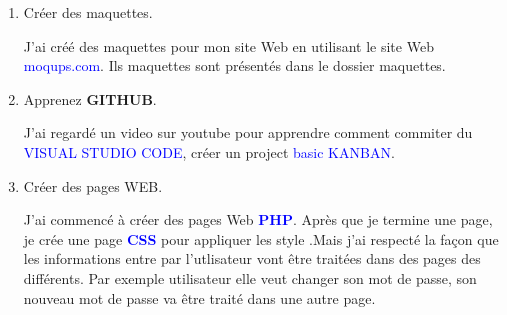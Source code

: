 \documentclass{article}
\begin{document}
\begin{enumerate}
\begin{enumerate}
        
        
        
        
         \item \textcolor{amethyst}{Créer des maquettes}.
         
         \vspace{0.4cm}
                \setlength{\parindent}{1cm} J'ai créé des maquettes pour mon site Web en utilisant le site Web \textcolor{blue}{moqups.com}. Ils maquettes sont présentés dans le dossier maquettes.
         
\hspace*{-1.05in}
               \noindent{}         
         \vspace{1cm}
         \item \textcolor{amethyst}{Apprenez \textbf{GITHUB}}.
         
         \vspace{0.4cm}
                \setlength{\parindent}{1cm} J'ai regardé un video sur youtube pour apprendre comment commiter du \textcolor{blue}{VISUAL STUDIO CODE}, créer un project \textcolor{blue}{basic KANBAN}.
         
         \item \textcolor{amethyst}{Créer des pages WEB}.
         
         \vspace{0.4cm}
                \setlength{\parindent}{1cm} J'ai commencé à créer des pages Web \textcolor{blue}{\textbf{PHP}}. Après que je termine une page, je crée une page \textcolor{blue}{\textbf{CSS}} pour appliquer les style .Mais j'ai respecté la façon que les informations entre par l'utlisateur vont  être traitées dans des pages des différents. Par exemple utilisateur elle veut changer son mot de passe, son nouveau mot de passe va être traité dans une autre page.
         

\end{enumerate}
\end{enumerate}
\end{document}
